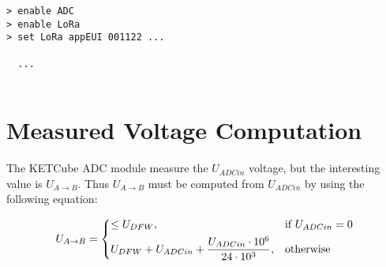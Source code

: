 \begin{docCodeExample}
\begin{verbatim}
> enable ADC
> enable LoRa 
> set LoRa appEUI 001122 ...

  ...
  
\end{verbatim}
\end{docCodeExample}


\section{Measured Voltage Computation}
  The KETCube ADC module measure the $U_{ADCin}$ voltage, but the interesting value is $U_{A \rightarrow B}$. Thus $U_{A \rightarrow B}$ must be computed from  $U_{ADCin}$ by using the following equation:
  
\[
   U_{A \rightarrow B} = 
   \begin{dcases}
     \leq U_{DFW}, & \text{if } U_{ADCin} = 0\\
     U_{DFW} + U_{ADCin} + \frac{U_{ADCin} \cdot 10^6}{24 \cdot 10^3}, & \text{otherwise}
   \end{dcases}
\]



  

\clearpage





